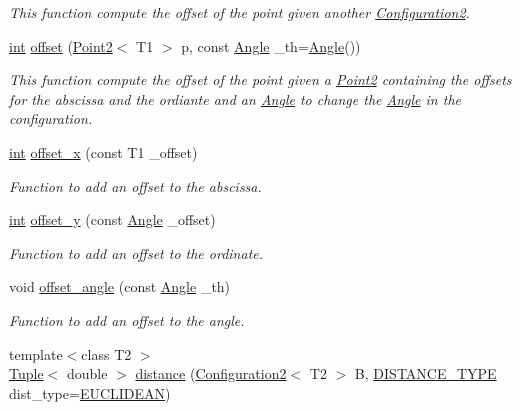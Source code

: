 \begin{DoxyCompactItemize}
\begin{DoxyCompactList}\small\item\em This function compute the offset of the point given another {\ttfamily \mbox{\hyperlink{class_configuration2}{Configuration2}}}. \end{DoxyCompactList}\item 
\mbox{\hyperlink{draw_8hh_aa620a13339ac3a1177c86edc549fda9b}{int}} \mbox{\hyperlink{class_configuration2_ad2f7df498d8fd4c0e125a1f628fa22b7}{offset}} (\mbox{\hyperlink{class_point2}{Point2}}$<$ T1 $>$ p, const \mbox{\hyperlink{class_angle}{Angle}} \+\_\+th=\mbox{\hyperlink{class_angle}{Angle}}())
\begin{DoxyCompactList}\small\item\em This function compute the offset of the point given a {\ttfamily \mbox{\hyperlink{class_point2}{Point2}}} containing the offsets for the abscissa and the ordiante and an {\ttfamily \mbox{\hyperlink{class_angle}{Angle}}} to change the {\ttfamily \mbox{\hyperlink{class_angle}{Angle}}} in the configuration. \end{DoxyCompactList}\item 
\mbox{\hyperlink{draw_8hh_aa620a13339ac3a1177c86edc549fda9b}{int}} \mbox{\hyperlink{class_configuration2_a49f13949ff2fbeefdac31bc0f9e13dab}{offset\+\_\+x}} (const T1 \+\_\+offset)
\begin{DoxyCompactList}\small\item\em Function to add an offset to the abscissa. \end{DoxyCompactList}\item 
\mbox{\hyperlink{draw_8hh_aa620a13339ac3a1177c86edc549fda9b}{int}} \mbox{\hyperlink{class_configuration2_ae29330a14b06e1ecb22a6bee4e954f81}{offset\+\_\+y}} (const \mbox{\hyperlink{class_angle}{Angle}} \+\_\+offset)
\begin{DoxyCompactList}\small\item\em Function to add an offset to the ordinate. \end{DoxyCompactList}\item 
void \mbox{\hyperlink{class_configuration2_a561351ec15558fdceb9f65ff6296a6a7}{offset\+\_\+angle}} (const \mbox{\hyperlink{class_angle}{Angle}} \+\_\+th)
\begin{DoxyCompactList}\small\item\em Function to add an offset to the angle. \end{DoxyCompactList}\item 
{\footnotesize template$<$class T2 $>$ }\\\mbox{\hyperlink{class_tuple}{Tuple}}$<$ double $>$ \mbox{\hyperlink{class_configuration2_a5cf4a74b6fe52cd7d8c9ff8472ff2df9}{distance}} (\mbox{\hyperlink{class_configuration2}{Configuration2}}$<$ T2 $>$ B, \mbox{\hyperlink{maths_8hh_ac50d7263b1cae8691420b86282b27f90}{D\+I\+S\+T\+A\+N\+C\+E\+\_\+\+T\+Y\+PE}} dist\+\_\+type=\mbox{\hyperlink{maths_8hh_ac50d7263b1cae8691420b86282b27f90a81bbbc4428c3ff3f1327e94957e2b5f1}{E\+U\+C\+L\+I\+D\+E\+AN}})

\end{DoxyCompactItemize}
